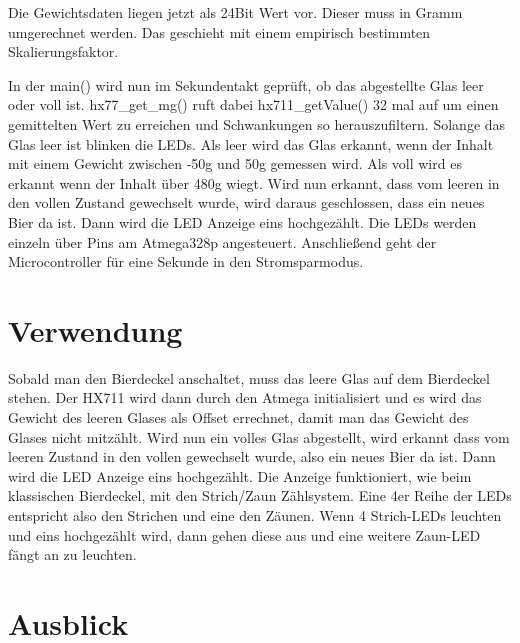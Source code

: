 \documentclass[12pt,journal]{IEEEtran}
\begin{document}
\hfil

\hfil

Die Gewichtsdaten liegen jetzt als 24Bit Wert vor. Dieser muss in Gramm umgerechnet werden.
Das geschieht mit einem empirisch bestimmten Skalierungsfaktor.

\hfil

\hfil

In der main() wird nun im Sekundentakt geprüft, ob das abgestellte Glas leer oder voll ist.
hx77\_get\_mg() ruft dabei hx711\_getValue() 32 mal auf um einen gemittelten Wert zu erreichen
und Schwankungen so herauszufiltern. Solange das Glas leer ist blinken die LEDs. Als leer wird das
Glas erkannt, wenn der Inhalt mit einem Gewicht zwischen -50g und 50g gemessen wird.
Als voll wird es erkannt wenn der Inhalt über 480g wiegt.
Wird nun erkannt, dass vom leeren in den vollen Zustand gewechselt wurde, wird daraus geschlossen, dass ein
neues Bier da ist. Dann wird die LED Anzeige eins hochgezählt. Die LEDs werden einzeln über Pins
am Atmega328p angesteuert.
Anschließend geht der Microcontroller für eine Sekunde in den Stromsparmodus.



\section{Verwendung}

Sobald man den Bierdeckel anschaltet, muss das leere Glas auf dem Bierdeckel stehen.
Der HX711 wird dann durch den Atmega initialisiert und es wird das Gewicht des leeren Glases
als Offset errechnet, damit man das Gewicht des Glases nicht mitzählt. Wird nun ein volles Glas
abgestellt, wird erkannt dass vom leeren Zustand in den vollen gewechselt wurde, also ein neues
Bier da ist. Dann wird die LED Anzeige eins hochgezählt. Die Anzeige funktioniert,
wie beim klassischen Bierdeckel, mit den Strich/Zaun Zählsystem. Eine 4er Reihe der LEDs
entspricht also den Strichen und eine den Zäunen. Wenn 4 Strich-LEDs leuchten und eins
hochgezählt wird, dann gehen diese aus und eine weitere Zaun-LED fängt an zu leuchten. 

\section{Ausblick}
\end{document}
